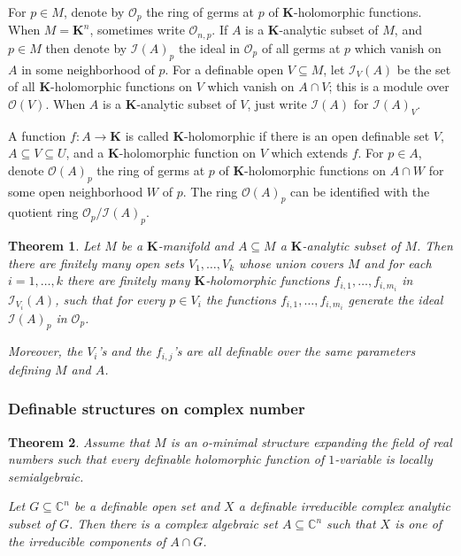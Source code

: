 \documentclass{amsart}
\newtheorem{theorem}{Theorem}[subsection]
\theoremstyle{definition}
\numberwithin{equation}{section}
\begin{document}
For $p\in M$, denote by $\mathcal{O}_p$ the ring of germs at $p$ of $\mathbf{K}$-holomorphic functions.
When $M = \mathbf{K}^n$, sometimes write $\mathcal{O}_{n,p}$.
If $A$ is a $\mathbf{K}$-analytic subset of $M$,
and $p \in M$ then denote by $\mathcal{I}(A)_p$ the ideal in $\mathcal{O}_p$ of all germs at $p$ which vanish on $A$ in some neighborhood of $p$.
For a definable open $V \subseteq M$,
let $\mathcal{I}_V(A)$ be the set of all $\mathbf{K}$-holomorphic functions on $V$ which vanish on $A \cap V$;
this is a module over $\mathcal{O}(V)$.
When $A$ is a $\mathbf{K}$-analytic subset of $V$,
just write $\mathcal{I}(A)$ for $\mathcal{I}(A)_V$.

A function $f: A \to \mathbf{K}$ is called $\mathbf{K}$-holomorphic if there is an open definable set $V$, $A \subseteq V \subseteq U$,
and a $\mathbf{K}$-holomorphic function on $V$ which extends $f$.
For $p \in A$, denote $\mathcal{O}(A)_p$ the ring of germs at $p$ of $\mathbf{K}$-holomorphic functions on $A \cap W$ for some open neighborhood $W$ of $p$.
The ring $\mathcal{O}(A)_p$ can be identified with the quotient ring $\mathcal{O}_p/\mathcal{I}(A)_p$.

\begin{tcolorbox}[title = {Coherence Theorem}]
\begin{theorem}
  Let $M$ be a $\mathbf{K}$-manifold and $A \subseteq M$ a $\mathbf{K}$-analytic subset of $M$.
  Then there are finitely many open sets $V_1,\dots,V_k$ whose union covers $M$ and for each $i = 1,\dots,k$
  there are finitely many $\mathbf{K}$-holomorphic functions $f_{i,1},\dots,f_{i,m_i}$ in $\mathcal{I}_{V_i} (A)$,
  such that for every $p \in V_i$ the functions $f_{i,1},\dots,f_{i,m_i}$ generate the ideal $\mathcal{I}(A)_p$ in $\mathcal{O}_p$.

  Moreover, the $V_i$'s and the $f_{i,j}$'s are all definable over the same parameters defining $M$ and $A$.
\end{theorem}
\end{tcolorbox}

\subsubsection{Definable structures on complex number}
\begin{theorem}
  Assume that $M$ is an o-minimal structure expanding the field of real numbers such that every definable holomorphic function of $1$-variable is locally semialgebraic.

  Let $G \subseteq \mathbb{C}^n$ be a definable open set and $X$ a definable irreducible complex analytic subset of $G$.
  Then there is a complex algebraic set $A \subseteq \mathbb{C}^n$ such that $X$ is one of the irreducible components of $A \cap G$.
\end{theorem}
\end{document}
